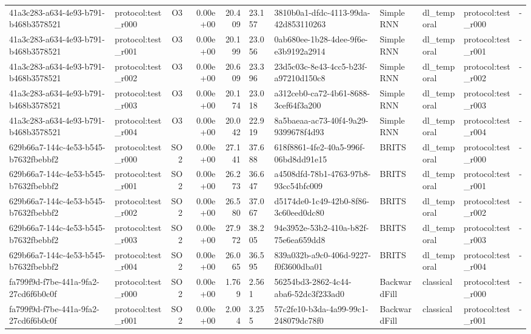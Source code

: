 \begin{table}[htbp]
\begin{tabular}{llrrr}
41a3c283-a634-4e93-b791-b468b3578521 & protocol:test\_r000 & O3 & 0.00e+00 & 20.409 & 23.157 & 3810b0a1-dfdc-4113-99da-42d853110263 & Simple RNN & dl\_temporal & protocol:test\_r000 & - \\
41a3c283-a634-4e93-b791-b468b3578521 & protocol:test\_r001 & O3 & 0.00e+00 & 20.199 & 23.056 & 0ab680ee-1b28-4dee-9f6e-e3b9192a2914 & Simple RNN & dl\_temporal & protocol:test\_r001 & - \\
41a3c283-a634-4e93-b791-b468b3578521 & protocol:test\_r002 & O3 & 0.00e+00 & 20.609 & 23.396 & 23d5c03c-8e43-4cc5-b23f-a97210d150c8 & Simple RNN & dl\_temporal & protocol:test\_r002 & - \\
41a3c283-a634-4e93-b791-b468b3578521 & protocol:test\_r003 & O3 & 0.00e+00 & 20.174 & 23.018 & a312ceb0-ca72-4b61-8688-3cef64f3a200 & Simple RNN & dl\_temporal & protocol:test\_r003 & - \\
41a3c283-a634-4e93-b791-b468b3578521 & protocol:test\_r004 & O3 & 0.00e+00 & 20.042 & 22.919 & 8a5baeaa-ac73-40f4-9a29-9399678f4d93 & Simple RNN & dl\_temporal & protocol:test\_r004 & - \\
629b66a7-144c-4e53-b545-b7632fbebbf2 & protocol:test\_r000 & SO2 & 0.00e+00 & 27.141 & 37.688 & 618f8861-4fe2-40a5-996f-06bd8dd91e15 & BRITS & dl\_temporal & protocol:test\_r000 & - \\
629b66a7-144c-4e53-b545-b7632fbebbf2 & protocol:test\_r001 & SO2 & 0.00e+00 & 26.273 & 36.647 & a4508dfd-78b1-4763-97b8-93cc54bfc009 & BRITS & dl\_temporal & protocol:test\_r001 & - \\
629b66a7-144c-4e53-b545-b7632fbebbf2 & protocol:test\_r002 & SO2 & 0.00e+00 & 26.580 & 37.067 & d5174de0-1c49-42b0-8f86-3c60eed0dc80 & BRITS & dl\_temporal & protocol:test\_r002 & - \\
629b66a7-144c-4e53-b545-b7632fbebbf2 & protocol:test\_r003 & SO2 & 0.00e+00 & 27.972 & 38.205 & 94e3952e-53b2-410a-b82f-75e6ea659dd8 & BRITS & dl\_temporal & protocol:test\_r003 & - \\
629b66a7-144c-4e53-b545-b7632fbebbf2 & protocol:test\_r004 & SO2 & 0.00e+00 & 26.065 & 36.595 & 839a032b-a9c0-406d-9227-f0f3600dba01 & BRITS & dl\_temporal & protocol:test\_r004 & - \\
fa799f9d-f7be-441a-9fa2-27cd6f6b0c0f & protocol:test\_r000 & SO2 & 0.00e+00 & 1.769 & 2.561 & 56254bd3-2862-4c44-aba6-52dc3f233ad0 & BackwardFill & classical & protocol:test\_r000 & - \\
fa799f9d-f7be-441a-9fa2-27cd6f6b0c0f & protocol:test\_r001 & SO2 & 0.00e+00 & 2.004 & 3.255 & 57c2fe10-b3da-4a99-99c1-248079dc78f0 & BackwardFill & classical & protocol:test\_r001 & - \\

\end{tabular}
\end{table}
